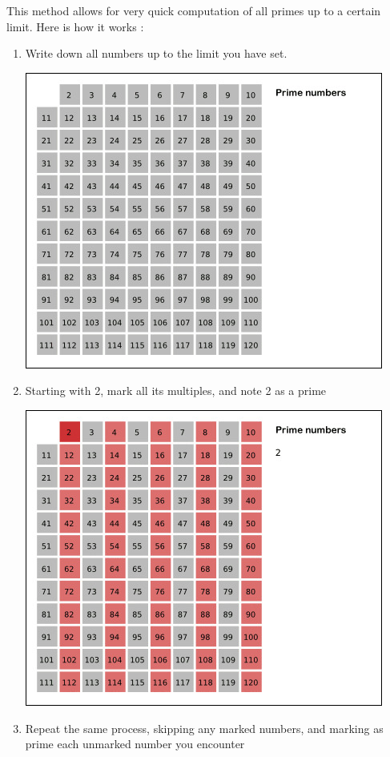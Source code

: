 \documentclass[12pt, titlepage]{article}
\begin{document}
    This method allows for very quick computation of all primes up to a certain limit. Here
    is how it works \autocite{wikipedia_eratosthenes_animation}:
    \begin{enumerate}
        \item Write down all numbers up to the limit you have set.

            \includegraphics[scale=0.6]{base}
        \item Starting with 2, mark all its multiples, and note 2 as a prime

            \includegraphics[scale=0.6]{2}\\
        \item Repeat the same process, skipping any marked numbers, and marking
            as prime each unmarked number you encounter


\end{enumerate}
\end{document}
